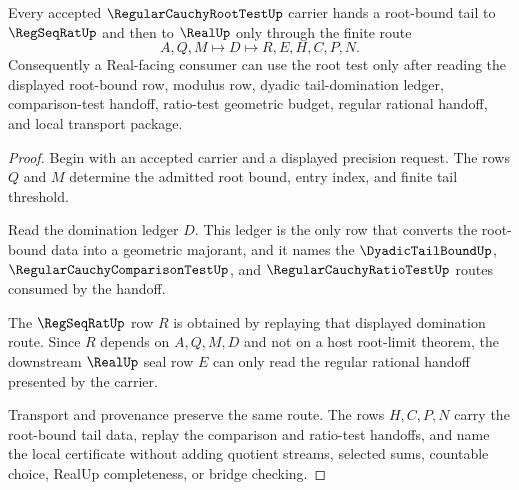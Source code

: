 \begin{theorem}
\label{thm:regular-cauchy-root-test-tail-bound-handoff}
Every accepted $\RegularCauchyRootTestUp$ carrier hands a root-bound tail to $\RegSeqRatUp$ and then to $\RealUp$ only through the finite route
$$
A,Q,M\longmapsto D\longmapsto R,E,H,C,P,N.
$$
Consequently a Real-facing consumer can use the root test only after reading the displayed root-bound row, modulus row, dyadic tail-domination ledger, comparison-test handoff, ratio-test geometric budget, regular rational handoff, and local transport package.
\end{theorem}
\begin{proof}
Begin with an accepted carrier and a displayed precision request. The rows $Q$ and $M$ determine the admitted root bound, entry index, and finite tail threshold.

Read the domination ledger $D$. This ledger is the only row that converts the root-bound data into a geometric majorant, and it names the $\DyadicTailBoundUp$, $\RegularCauchyComparisonTestUp$, and $\RegularCauchyRatioTestUp$ routes consumed by the handoff.

The $\RegSeqRatUp$ row $R$ is obtained by replaying that displayed domination route. Since $R$ depends on $A,Q,M,D$ and not on a host root-limit theorem, the downstream $\RealUp$ seal row $E$ can only read the regular rational handoff presented by the carrier.

Transport and provenance preserve the same route. The rows $H,C,P,N$ carry the root-bound tail data, replay the comparison and ratio-test handoffs, and name the local certificate without adding quotient streams, selected sums, countable choice, RealUp completeness, or bridge checking.
\end{proof}



